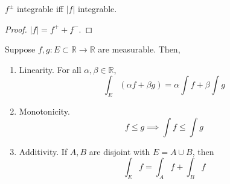   \begin{theorem}
    $f^\pm$ integrable iff $|f|$ integrable. 
  \end{theorem}
  \begin{proof}
    $|f| = f^+ + f^-$. 
  \end{proof}

  \begin{theorem}
    Suppose $f, g : E \subset \mathbb{R} \to \mathbb{R}$ are measurable. Then, 
    \begin{enumerate}
      \item Linearity. For all $\alpha, \beta \in \mathbb{R}$, 
        \begin{equation}
          \int_E (\alpha f + \beta g) = \alpha \int f + \beta \int g
        \end{equation}

      \item Monotonicity. 
        \begin{equation}
          f \leq g \implies \int f \leq \int g
        \end{equation}

      \item Additivity. If $A, B$ are disjoint with $E = A \cup B$, then 
        \begin{equation}
          \int_E f = \int_A f + \int_B f
        \end{equation}
    \end{enumerate}
  \end{theorem} 
